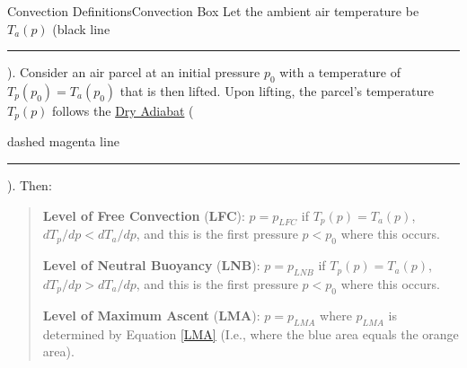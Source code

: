 \begin{fact}{Convection Definitions}{Convection Box}\label{Convection Box}
    Let the ambient air temperature be $T_a(p)$ (black line \textcolor{black}{\rule{0.25cm}{0.25cm}}). Consider an air parcel at an initial pressure $p_0$ with a temperature of $T_p(p_0)=T_a(p_0)$ that is then lifted. Upon lifting, the parcel's temperature $T_p(p)$ follows the \hyperref[Dry Adiabat]{Dry Adiabat} (\textcolor{mymagenta}{dashed magenta line \rule{0.25cm}{0.25cm}}). Then:
    \begin{quote}
        \textbf{Level of Free Convection} (\textbf{LFC}): $p=p_{LFC}$ if $T_p(p)=T_a(p)$, $dT_p/dp<dT_a/dp$, and this is the first pressure $p<p_0$ where this occurs.

        \textbf{Level of Neutral Buoyancy} (\textbf{LNB}): $p=p_{LNB}$ if $T_p(p)=T_a(p)$, $dT_p/dp>dT_a/dp$, and this is the first pressure $p<p_0$ where this occurs.

        \textbf{Level of Maximum Ascent} (\textbf{LMA}): $p=p_{LMA}$ where $p_{LMA}$ is determined by Equation \ref{LMA} (I.e., where the blue area equals the orange area).
    \end{quote}


\end{fact}
